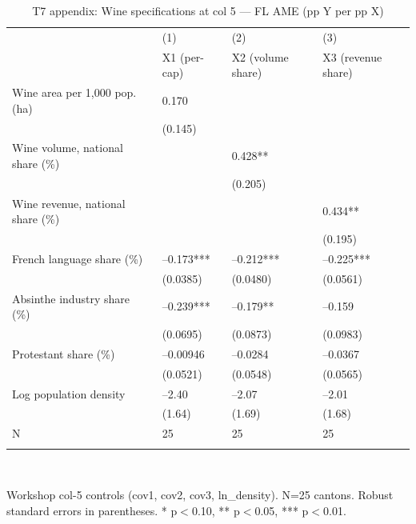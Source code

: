 \begin{table}[tbp] \centering
{}

\caption{T7 appendix: Wine specifications at col 5 --- FL AME (pp Y per pp X)}
\label{tab:T7_col5_FL}
\begin{tabularx}{\linewidth}{@{}lCCC@{}}

\toprule
&{(1)}&{(2)}&{(3)} \tabularnewline
 & X1 (per-cap) & X2 (volume share) & X3 (revenue share) \tabularnewline 
\midrule \addlinespace[\belowrulesep]
Wine area per 1,000 pop. (ha)&0.170&& \tabularnewline
&(0.145)&& \tabularnewline
Wine volume, national share (\%)&&0.428**& \tabularnewline
&&(0.205)& \tabularnewline
Wine revenue, national share (\%)&&&0.434** \tabularnewline
&&&(0.195) \tabularnewline
French language share (\%)&--0.173***&--0.212***&--0.225*** \tabularnewline
&(0.0385)&(0.0480)&(0.0561) \tabularnewline
Absinthe industry share (\%)&--0.239***&--0.179**&--0.159 \tabularnewline
&(0.0695)&(0.0873)&(0.0983) \tabularnewline
Protestant share (\%)&--0.00946&--0.0284&--0.0367 \tabularnewline
&(0.0521)&(0.0548)&(0.0565) \tabularnewline
Log population density&--2.40&--2.07&--2.01 \tabularnewline
&(1.64)&(1.69)&(1.68) \tabularnewline
\midrule N&25&25&25 \tabularnewline
\bottomrule \addlinespace[\belowrulesep]

\end{tabularx}
\\ \parbox{\linewidth}{\footnotesize Workshop col-5 controls (cov1, cov2, cov3, ln\_density). N=25 cantons. Robust standard errors in parentheses. * p\(<\)0.10, ** p\(<\)0.05, *** p\(<\)0.01.}
\end{table}
